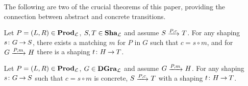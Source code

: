 %
The following are two of the crucial theorems of this paper, providing the
connection between abstract and concrete transitions.
%
\begin{theorem}
\label{th:abs2con}
Let $P=(L,R)\in \mathbf{Prod}_{\cal L}$, $S,T\in \mathbf{Sha}_{\cal L}$ and assume $S\trans{P,c} T$.
For any shaping $s\colon {G} \mathbin{\rightarrow} {S}$, there exists a matching $m$ for $P$ in
$G$ such that $c=s\circ m$, and for $G\trans{P,m} H$ there is a shaping
$t\colon {H} \mathbin{\rightarrow} {T}$.
\end{theorem}
%
\begin{theorem}
\label{th:con2abs}
  Let $P=(L,R)\in \mathbf{Prod}_{\cal L}$, $G\in \mathbf{DGra}_{\cal L}$ and assume $G\trans{P,m} H$.
  For any shaping $s\colon {G} \mathbin{\rightarrow} {S}$ such that $c=s\circ m$ is concrete,
  $S\trans{P,c} T$ with a shaping $t\colon {H} \mathbin{\rightarrow} {T}$.
\end{theorem}

